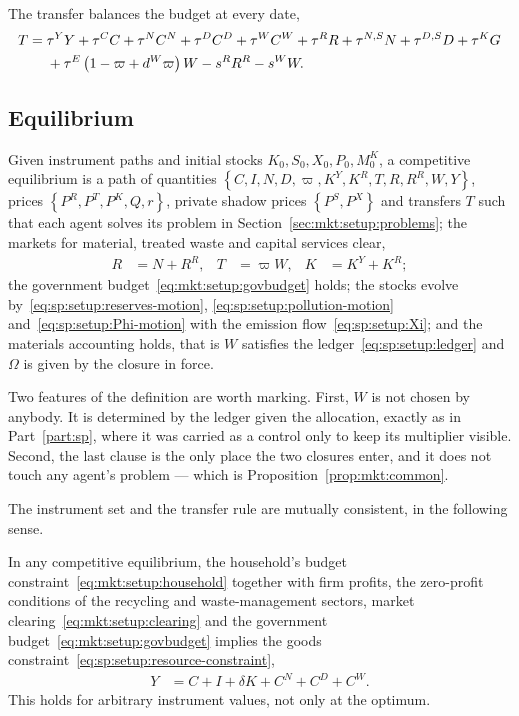  The transfer balances the budget at every date,
\begin{align}
T &= \tau^YY+\tau^CC+\tau^NC^N+\tau^DC^D+\tau^WC^W
+\tau^RR+\tau^{N,S}N+\tau^{D,S}D+\tau^KG
\notag\\
&\phantom{{}={}}
+\tau^E\left(1-\varpi+d^W\varpi\right)W-s^RR^R-s^WW .
\label{eq:mkt:setup:govbudget}
\end{align}


\subsection{Equilibrium}\label{sec:mkt:setup:equilibrium}

\begin{definition}\label{def:mkt:equilibrium}
Given instrument paths and initial stocks $K_0,S_0,X_0,P_0,M^K_0$, a competitive equilibrium is a path
of quantities $\left\{C,I,N,D,\varpi,K^Y,K^R,T,R,R^R,W,Y\right\}$, prices
$\left\{P^R,P^T,P^K,Q,r\right\}$, private shadow prices $\left\{P^S,P^X\right\}$ and transfers $T$ such
that each agent solves its problem in Section~\ref{sec:mkt:setup:problems}; the markets for material,
treated waste and capital services clear,
\begin{align}
R &= N+R^R,
&
T &= \varpi W,
&
K &= K^Y+K^R;
\label{eq:mkt:setup:clearing}
\end{align}
the government budget~\eqref{eq:mkt:setup:govbudget} holds; the stocks evolve
by~\eqref{eq:sp:setup:reserves-motion}, \eqref{eq:sp:setup:pollution-motion}
and~\eqref{eq:sp:setup:Phi-motion} with the emission flow~\eqref{eq:sp:setup:Xi}; and the materials
accounting holds, that is $W$ satisfies the ledger~\eqref{eq:sp:setup:ledger} and $\Omega$ is given by
the closure in force.
\end{definition}

Two features of the definition are worth marking. First, $W$ is not chosen by anybody. It is
determined by the ledger given the allocation, exactly as in Part~\ref{part:sp}, where it was carried
as a control only to keep its multiplier visible. Second, the last clause is the only place the two
closures enter, and it does not touch any agent's problem --- which is
Proposition~\ref{prop:mkt:common}.

 The instrument set and the transfer rule are mutually consistent, in the
following sense.

\begin{proposition}
\label{prop:mkt:walras}
In any competitive equilibrium, the household's budget
constraint~\eqref{eq:mkt:setup:household} together with firm profits, the zero-profit conditions of the
recycling and waste-management sectors, market clearing~\eqref{eq:mkt:setup:clearing} and the
government budget~\eqref{eq:mkt:setup:govbudget} implies the goods
constraint~\eqref{eq:sp:setup:resource-constraint},
\begin{align}
Y &= C+I+\delta K+C^N+C^D+C^W .
\label{eq:mkt:setup:resource}
\end{align}
This holds for arbitrary instrument values, not only at the optimum.
\end{proposition}

